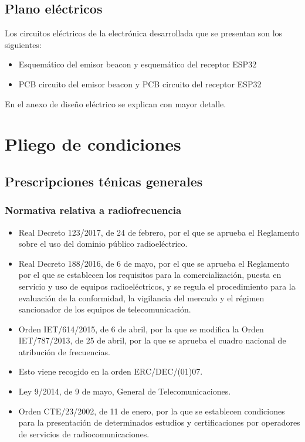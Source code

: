 \documentclass[a4paper ,12pt, onecolumn]{article}
\begin{document}
    \subsection{Plano eléctricos}
        Los circuitos eléctricos de la electrónica desarrollada que se presentan son los siguientes:
        \begin{itemize}
            \item Esquemático del emisor beacon y esquemático del receptor ESP32
            \item PCB circuito del emisor beacon y PCB circuito del receptor ESP32
        \end{itemize}
        En el anexo de diseño eléctrico se explican con mayor detalle.
\section{Pliego de condiciones}
    \subsection{Prescripciones ténicas generales}
    \subsubsection{Normativa relativa a radiofrecuencia}
        \begin{itemize}
            \item Real Decreto 123/2017, de 24 de febrero, por el que se aprueba el Reglamento
            sobre el uso del dominio público radioeléctrico.
            \item Real Decreto 188/2016, de 6 de mayo, por el que se aprueba el Reglamento 
            por el que se establecen los requisitos para la comercialización, puesta en servicio 
            y uso de equipos radioeléctricos, y se regula el procedimiento para la evaluación de
            la conformidad, la vigilancia del mercado y el régimen sancionador de los equipos de
            telecomunicación.
            \item Orden IET/614/2015, de 6 de abril, por la que se modifica la Orden IET/787/2013,
            de 25 de abril, por la que se aprueba el cuadro nacional de atribución de frecuencias.
            \item Esto viene recogido en la orden ERC/DEC/(01)07.
            \item Ley 9/2014, de 9 de mayo, General de Telecomunicaciones.
            \item Orden CTE/23/2002, de 11 de enero, por la que se establecen condiciones para la presentación de determinados
            estudios y certificaciones por operadores de servicios de radiocomunicaciones. 
          
        \end{itemize}
\end{document}
